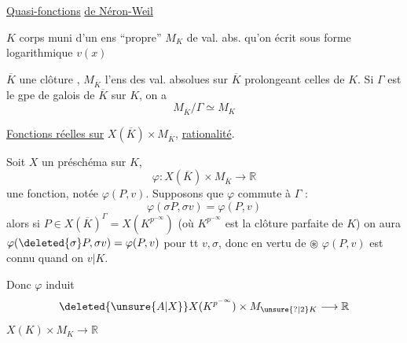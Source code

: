 \begin{center}\uline{Quasi-fonctions} \uline{de Néron-Weil}\end{center}

$K$ corps muni d'un ens ``propre'' $M_K$ de val. abs. qu'on écrit sous forme logarithmique $v(x)$

$\overline K$ une clôture  , $M_{\overline K}$ l'ens des val. absolues sur $\overline K$ prolongeant celles de $K$. Si $\Gamma$ est le gpe de galois de $\overline K$ sur $K$, on a
\[
M_{\overline K}/\Gamma\simeq M_K
\]
\margin{$\circledast$}

\uline{Fonctions réelles sur} $X(\overline K)\times M_{\overline K}$,  \uline{rationalité}.

Soit $X$ un préschéma sur $K$, \deleted{[\unsure{quelconque}} 
\[
\varphi:X(\overline K)\times M_{\overline K}\longrightarrow\mathbb R
\]
une fonction, notée $\varphi(P,v)$. Supposons que $\varphi$ commute à $\Gamma$ :
\[
\varphi(\sigma P,\sigma v)=\varphi(P,v)
\]
alors  si \deleted{\unsure{$\sigma$}} $P\in X(\overline K)^\Gamma=X(K^{p^{-\infty}})$ (où $K^{p^{-\infty}}$ est la clôture parfaite de $K$)  on aura $\varphi(\deleted{\sigma}P,\sigma v)=\varphi(P,v)$ pour tt $v,\sigma$, donc en vertu de $\circledast$ $\varphi(P,v)$ est connu quand on  \deleted{\unsure{$\sigma$}} $v|K$.

Donc $\varphi$ induit
\[
\deleted{\unsure{A|X}}X(K^{p^{-\infty}})\times M_{\unsure{?|2}K}\longrightarrow\mathbb R
\]
  $X(K)\times M_K\longrightarrow\mathbb R$
